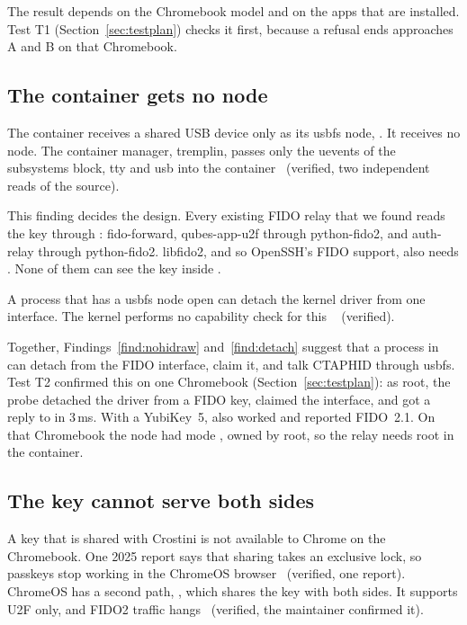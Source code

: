 \begin{pitfall}
The result depends on the Chromebook model and on the apps that are
installed. Test T1 (Section~\ref{sec:testplan}) checks it first, because a
refusal ends approaches A and B on that Chromebook.
\end{pitfall}

\subsection{The container gets no  node}

\begin{finding}
\label{find:nohidraw}
The  container receives a shared USB device only as its usbfs
node, . It receives no
 node. The container manager, tremplin, passes only the uevents
of the subsystems block, tty and usb into the container~\cite{tremplin}
(verified, two independent reads of the source).
\end{finding}

This finding decides the design. Every existing FIDO relay that we found
reads the key through : fido-forward, qubes-app-u2f through
python-fido2, and auth-relay through python-fido2. libfido2, and so OpenSSH's
FIDO support, also needs . None of them can see the key inside
.

\begin{finding}
\label{find:detach}
A process that has a usbfs node open can detach the kernel driver from one
interface. The kernel performs no capability check for this
~\cite{devio} (verified).
\end{finding}

Together, Findings~\ref{find:nohidraw} and~\ref{find:detach} suggest that a
process in  can detach  from the FIDO interface,
claim it, and talk CTAPHID through usbfs. Test T2 confirmed this on one
Chromebook (Section~\ref{sec:testplan}): as root, the probe detached the
driver from a FIDO key, claimed the interface, and got a reply to
 in 3\,ms. With a YubiKey~5, 
also worked and reported FIDO~2.1. On that Chromebook the node had mode
, owned by root, so the relay needs root in the container.

\subsection{The key cannot serve both sides}

A key that is shared with Crostini is not available to Chrome on the
Chromebook. One 2025 report says that sharing takes an exclusive lock, so
passkeys stop working in the ChromeOS browser~\cite{crosvmdev} (verified, one
report). ChromeOS has a second path, , which shares the
key with both sides. It supports U2F only, and FIDO2 traffic
hangs~\cite{crosvmdev} (verified, the maintainer confirmed it).
